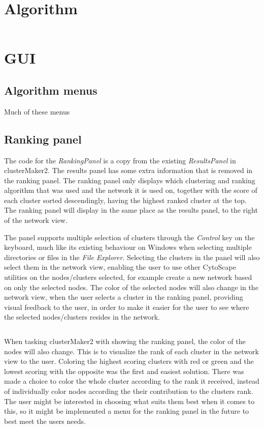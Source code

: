 \section{Algorithm}

\inputminted[linenos,fontsize=\scriptsize,firstline=260,lastline=282]{java}{../ranklust/src/main/java/edu/ucsf/rbvi/clusterMaker2/internal/api/Rank.java}
\section{GUI}
\subsection{Algorithm menus}
Much of these menus
\subsection{Ranking panel}
The code for the \textit{RankingPanel} is a copy from the existing
\textit{ResultsPanel} in clusterMaker2. The results panel has some extra
information that is removed in the ranking panel. The ranking panel only
displays which clustering and ranking algorithm that was used and the network it
is used on, together with the score of each cluster sorted descendingly, having
the highest ranked cluster at the top. The ranking panel will display in the
same place as the results panel, to the right of the network view.

The panel supports multiple selection of clusters through the \textit{Control}
key on the keyboard, much like its existing behaviour on Windows when selecting
multiple directories or files in the \textit{File Explorer}. Selecting the
clusters in the panel will also select them in the network view, enabling the
user to use other CytoScape utilities on the nodes/clusters selected, for
example create a new network based on only the selected nodes. The color of the
selected nodes will also change in the network view, when the user selects a
cluster in the ranking panel, providing visual feedback to the user, in order to
make it easier for the user to see where the selected nodes/clusters resides in
the network.
\inputminted[linenos,fontsize=\scriptsize,firstline=260,lastline=282]{java}{../ranklust/src/main/java/edu/ucsf/rbvi/clusterMaker2/internal/ui/RankingPanel.java}

When tasking clusterMaker2 with showing the ranking panel, the color of the
nodes will also change. This is to visualize the rank of each cluster in the
network view to the user. Coloring the highest scoring clusters with red or
green and the lowest scoring with the opposite was the first and easiest
solution. There was made a choice to color the whole cluster according to the
rank it received, instead of individually color nodes according the their
contribution to the clusters rank. The user might be interested in choosing what
suits them best when it comes to this, so it might be implemented a menu for the
ranking panel in the future to best meet the users needs.

